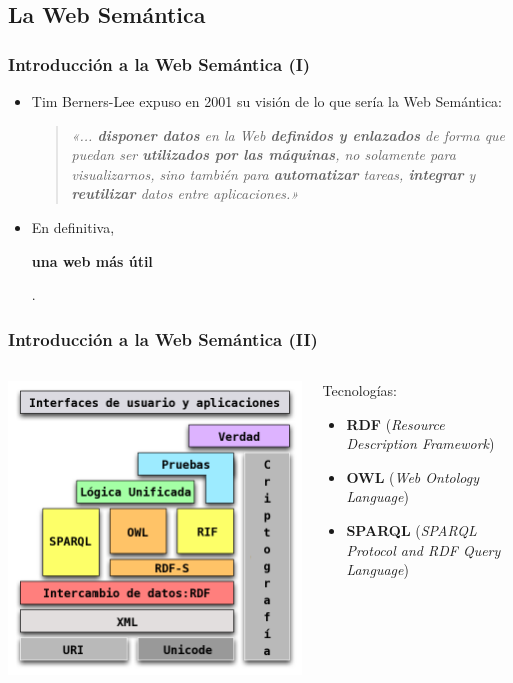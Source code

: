 \documentclass[spanish,notes=hide]{beamer}
\begin{document}
\subsection{La Web Semántica}
\frame
{
  \frametitle{Introducción a la Web Semántica (I)}

  \begin{itemize}
   \item<1-> Tim Berners-Lee expuso en 2001 su visión de lo que sería la Web Semántica:
     \begin{quote}
	\emph{«... \textbf{disponer datos} en la Web \textbf{definidos y enlazados} 
	de forma que puedan ser \textbf{utilizados por las máquinas}, no solamente 
	para visualizarnos, sino también para \textbf{automatizar} tareas, 
	\textbf{integrar} y \textbf{reutilizar} datos entre aplicaciones.»}
     \end{quote}
   \item<2-> En definitiva, \begin{Large}\textbf{una web más útil}\end{Large}.
  \end{itemize}
}
\frame
{
  \frametitle{Introducción a la Web Semántica (II)}

  \begin{columns}
    \begin{column}{0.6\textwidth}
	\includegraphics[width=\textwidth]{images/pila-web-semantica.png}
    \end{column}
    \begin{column}{0.4\textwidth}
      Tecnologías:
      \begin{itemize}
	\item \textbf{RDF} (\textit{Resource Description Framework})
	\item \textbf{OWL} (\textit{Web Ontology Language})
	\item \textbf{SPARQL} (\textit{SPARQL Protocol and RDF Query Language})
      \end{itemize}
    \end{column}
  \end{columns}
}
\end{document}
